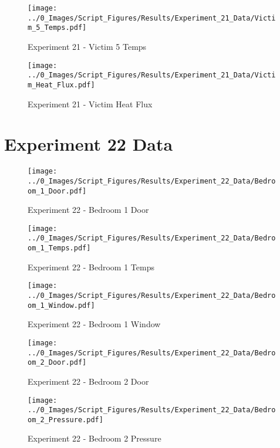 	\begin{figure}[H]
		\centering
		\texttt{[image: ../0\_Images/Script\_Figures/Results/Experiment\_21\_Data/Victim\_5\_Temps.pdf]}
		\caption[]{Experiment 21 - Victim 5 Temps}
	\end{figure}
 
	\clearpage

	\begin{figure}[H]
		\centering
		\texttt{[image: ../0\_Images/Script\_Figures/Results/Experiment\_21\_Data/Victim\_Heat\_Flux.pdf]}
		\caption[]{Experiment 21 - Victim Heat Flux}
	\end{figure}
 

\clearpage		\large
\section{Experiment 22 Data} \label{App:Exp22Results} 

	\begin{figure}[H]
		\centering
		\texttt{[image: ../0\_Images/Script\_Figures/Results/Experiment\_22\_Data/Bedroom\_1\_Door.pdf]}
		\caption[]{Experiment 22 - Bedroom 1 Door}
	\end{figure}
 

	\begin{figure}[H]
		\centering
		\texttt{[image: ../0\_Images/Script\_Figures/Results/Experiment\_22\_Data/Bedroom\_1\_Temps.pdf]}
		\caption[]{Experiment 22 - Bedroom 1 Temps}
	\end{figure}
 
	\clearpage

	\begin{figure}[H]
		\centering
		\texttt{[image: ../0\_Images/Script\_Figures/Results/Experiment\_22\_Data/Bedroom\_1\_Window.pdf]}
		\caption[]{Experiment 22 - Bedroom 1 Window}
	\end{figure}
 

	\begin{figure}[H]
		\centering
		\texttt{[image: ../0\_Images/Script\_Figures/Results/Experiment\_22\_Data/Bedroom\_2\_Door.pdf]}
		\caption[]{Experiment 22 - Bedroom 2 Door}
	\end{figure}
 
	\clearpage

	\begin{figure}[H]
		\centering
		\texttt{[image: ../0\_Images/Script\_Figures/Results/Experiment\_22\_Data/Bedroom\_2\_Pressure.pdf]}
		\caption[]{Experiment 22 - Bedroom 2 Pressure}
	\end{figure}
 

